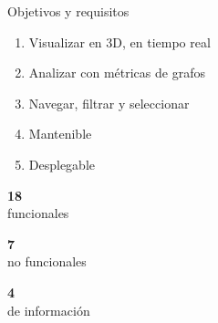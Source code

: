 \documentclass[aspectratio=169, 12pt]{beamer}
\begin{document}
\begin{frame}{Objetivos y requisitos}
	\vfill
	\begin{center}
		\begin{minipage}{0.8\paperwidth}\normalsize
			\begin{enumerate}
				\setlength{\itemsep}{0.2em}
				\item Visualizar en 3D, en tiempo real
				\item Analizar con métricas de grafos
				\item Navegar, filtrar y seleccionar
				\item Mantenible
				\item Desplegable
			\end{enumerate}
		\end{minipage}
	\end{center}
	\vspace{0.3em}
	\begin{center}
		\begin{minipage}[t]{0.3\textwidth}\centering
			{\color{acento}\fontsize{28}{28}\selectfont\bfseries 18}\\[0.3em]{\large funcionales}
		\end{minipage}%
		\begin{minipage}[t]{0.3\textwidth}\centering
			{\color{verde}\fontsize{28}{28}\selectfont\bfseries 7}\\[0.3em]{\large no funcionales}
		\end{minipage}%
		\begin{minipage}[t]{0.3\textwidth}\centering
			{\color{ambar}\fontsize{28}{28}\selectfont\bfseries 4}\\[0.3em]{\large de información}
		\end{minipage}
	\end{center}
	\vfill
\end{frame}
\end{document}
